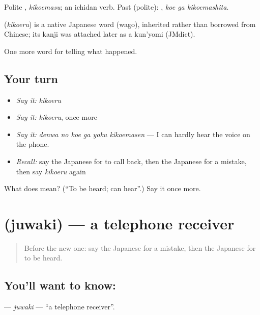 Polite \textbf{}, \emph{kikoemasu}; an ichidan verb. Past (polite): \textbf{ }, \emph{koe ga kikoemashita}.

\begin{cousinweb}
\textbf{} (\emph{kikoeru}) is a native Japanese word (wago), inherited rather than borrowed from Chinese; its kanji was attached later as a kun'yomi (JMdict).
\end{cousinweb}

\begin{grammarlens}[title={What you've built}]
One more word for telling what happened.
\end{grammarlens}

\subsection*{Your turn}
\begin{itemize}
\raggedright
  \item \emph{Say it:} \emph{kikoeru}
  \item \emph{Say it:} \emph{kikoeru}, once more
  \item \emph{Say it:} \emph{denwa no koe ga yoku kikoemasen} — I can hardly hear the voice on the phone.
  \item \emph{Recall:} say the Japanese for to call back, then the Japanese for a mistake, then say \emph{kikoeru} again
\end{itemize}

\begin{tcolorbox}[breakable,colback=teal!4,colframe=teal!35!black,title={Before you move on}]
What does  mean? (\textquotedblleft{}To be heard; can hear\textquotedblright{}.) Say it once more.
\end{tcolorbox}
\section[\texorpdfstring{\ja{じゅわき} (juwaki)}{じゅわき (juwaki)}]{ (juwaki) — a telephone receiver}

\label{lesson:JA-C308-juwaki}



\begin{quote}
Before the new one: say the Japanese for a mistake, then the Japanese for to be heard.
\end{quote}

\subsection*{You'll want to know: }
\textbf{} — \emph{juwaki} — \textquotedblleft{}a telephone receiver\textquotedblright{}.

